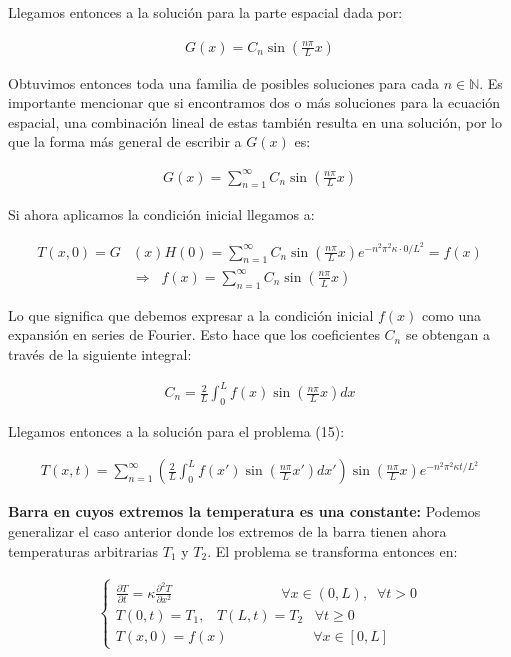 \documentclass[12pt]{article}
\begin{document}
Llegamos entonces a la solución para la parte espacial dada por:

\begin{align*}
    G(x) = C_n\sin\left(\frac{n\pi}{L}x\right)
\end{align*}

Obtuvimos entonces toda una familia de posibles soluciones para cada $n\in \mathbb{N}$. Es importante mencionar que si encontramos dos o más soluciones para la ecuación espacial, una combinación lineal de estas también resulta en una solución, por lo que la forma más general de escribir a $G(x)$ es:

\begin{align*}
    G(x) = \sum_{n=1}^{\infty} C_n\sin\left(\frac{n\pi}{L}x\right)
\end{align*}

Si ahora aplicamos la condición inicial llegamos a:

\begin{align*}
    T(x,0) = G&(x)H(0) = \sum_{n=1}^{\infty} C_n\sin\left(\frac{n\pi}{L}x\right) e^{-n^2\pi^2\kappa \cdot 0/L^2} = f(x) \\
    &\Rightarrow \;\; f(x) = \sum_{n=1}^{\infty} C_n\sin\left(\frac{n\pi}{L}x\right)
\end{align*}

Lo que significa que debemos expresar a la condición inicial $f(x)$ como una expansión en series de Fourier. Esto hace que los coeficientes $C_n$ se obtengan a través de la siguiente integral:

\begin{align*}
    C_n = \frac{2}{L}\int_0^L f(x)\sin \left(\frac{n\pi}{L}x\right)dx 
\end{align*}

Llegamos entonces a la solución para el problema (15):

\begin{align}
    T(x,t) = \sum_{n=1}^{\infty} \left(\frac{2}{L}\int_0^L f(x')\sin \left(\frac{n\pi}{L}x'\right)dx'\right)\sin\left(\frac{n\pi}{L}x\right) e^{-n^2\pi^2\kappa t/L^2}
\end{align}

\textbf{Barra en cuyos extremos la temperatura es una constante: } Podemos generalizar el caso anterior donde los extremos de la barra tienen ahora temperaturas arbitrarias $T_1$ y $T_2$. El problema se transforma entonces en:

\begin{align}
    \begin{cases}
        \frac{\partial T}{\partial t} = \kappa \frac{\partial^2 T}{\partial x^2} \;\;\;\;\;\;\;\;\;\;\;\;\;\;\;\;\;\;\;\;\;\;\;\;\;\;\;\; \forall x\in (0,L), \;\; \forall t>0 \\
        T(0,t) = T_1, \;\;\; T(L,t) = T_2 \;\;\; \forall t \geq 0 \\
        T(x,0) = f(x) \;\;\;\;\;\;\;\;\;\;\;\;\;\;\;\;\;\;\;\;\;\; \forall x\in [0,L]
    \end{cases}
\end{align}
\end{document}
